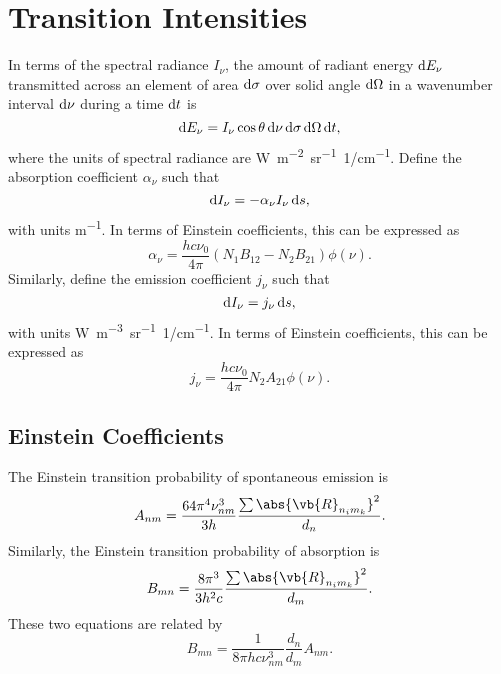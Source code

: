 \documentclass[11pt, twoside, fleqn]{report}
\begin{document}
\section{Transition Intensities}

In terms of the spectral radiance $I_\nu$, the amount of radiant energy $\odif{E_\nu}$ transmitted across an element of area $\odif{\sigma}$ over solid angle $\odif{\Omega}$ in a wavenumber interval $\odif{\nu}$ during a time $\odif{t}$ is \cite{chandrasekharRadiativeTransfer2016}
\begin{equation*}
    \odif{E_\nu} = I_\nu\cos\theta\odif{\nu}\odif{\sigma}\odif{\Omega}\odif{t},
\end{equation*}
where the units of spectral radiance are \unit{W.m^{-2}.sr^{-1}.1/cm^{-1}}.
Define the absorption coefficient $\alpha_\nu$ such that \cite{rybickiRadiativeProcessesAstrophysics2004}
\begin{equation*}
    \odif{I_\nu} = -\alpha_\nu I_\nu\odif{s},
\end{equation*}
with units \unit{m^{-1}}.
In terms of Einstein coefficients, this can be expressed as
\begin{equation*}
    \alpha_\nu = \frac{hc\nu_0}{4\pi}(N_1B_{12} - N_2B_{21})\phi(\nu).
\end{equation*}
Similarly, define the emission coefficient $j_\nu$ such that \cite{rybickiRadiativeProcessesAstrophysics2004}
\begin{equation*}
    \odif{I_\nu} = j_\nu\odif{s},
\end{equation*}
with units \unit{W.m^{-3}.sr^{-1}.1/cm^{-1}}.
In terms of Einstein coefficients, this can be expressed as
\begin{equation*}
    j_\nu = \frac{hc\nu_0}{4\pi}N_2A_{21}\phi(\nu).
\end{equation*}

\subsection{Einstein Coefficients}

The Einstein transition probability of spontaneous emission is
\begin{equation*}
    A_{nm} = \frac{64\pi^4\nu_{nm}^3}{3h}\frac{\sum\abs{\vb{R}_{n_im_k}}^2}{d_n}.
\end{equation*}
Similarly, the Einstein transition probability of absorption is
\begin{equation*}
    B_{mn} = \frac{8\pi^3}{3h^2c}\frac{\sum\abs{\vb{R}_{n_im_k}}^2}{d_m}.
\end{equation*}
These two equations are related by
\begin{equation*}
    B_{mn} = \frac{1}{8\pi hc\nu_{nm}^3}\frac{d_n}{d_m}A_{nm}.
\end{equation*}
\end{document}
